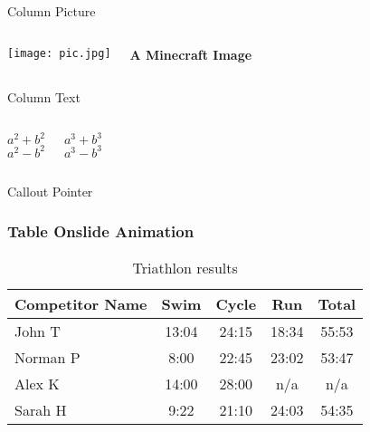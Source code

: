 \documentclass{beamer}
\begin{document}
\begin{frame}{Column Picture}
    \begin{columns}
        
        \texttt{[image: pic.jpg]}
        
        \textbf{A Minecraft Image}
    \end{columns}
\end{frame}

\begin{frame}{Column Text}
    \begin{columns}
        \color{red} %
        $a^2+b^2$ \pause \\
        $a^2-b^2$ \pause

        \color{blue}
        $a^3+b^3$ \pause \\
        $a^3-b^3$
    \end{columns}
\end{frame}

\begin{frame}{Callout Pointer}
\end{frame}

\begin{frame}
\label{table}
\frametitle{Table Onslide Animation}
    \begin{table}
        \begin{tabular}{l | c | c | c | c }
            Competitor Name & Swim & Cycle & Run & Total \\
            \hline \hline
            John T & 13:04 & 24:15 & 18:34 & 55:53  \\ 
            Norman P & 8:00 & 22:45 & 23:02 & 53:47 \\
            Alex K & 14:00 & 28:00 & n/a & n/a \\
            Sarah H & 9:22 & 21:10 & 24:03 & 54:35 
        \end{tabular}
        \caption{Triathlon results}
    \end{table}
\end{frame}
\end{document}
